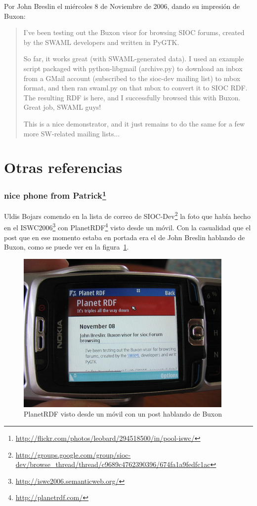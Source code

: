 Por John Breslin el miércoles 8 de Noviembre de 2006, dando su impresión de Buxon:

\begin{quote}
 I've been testing out the Buxon visor for browsing SIOC forums, created by the SWAML 
 developers and written in PyGTK.

 So far, it works great (with SWAML-generated data). I used an example script packaged 
 with python-libgmail (archive.py) to download an inbox from a GMail account (subscribed 
 to the sioc-dev mailing list) to mbox format, and then ran swaml.py on that mbox to 
 convert it to SIOC RDF. The resulting RDF is here, and I successfully browsed this with 
 Buxon. Great job, SWAML guys!

 This is a nice demonstrator, and it just remains to do the same for a few more 
 SW-related mailing lists...
\end{quote}

\section{Otras referencias}

\subsubsection*{nice phone from Patrick\footnote{\url{http://flickr.com/photos/leobard/294518500/in/pool-iswc/}}}

Uldis Bojars comendo en la lista de correo de SIOC-Dev\footnote{\url{http://groups.google.com/group/sioc-dev/browse_thread/thread/c9689c4762390396/674fa1a9fedfc1ac}}
la foto que había hecho en el ISWC2006\footnote{\url{http://iswc2006.semanticweb.org/}}
con PlanetRDF\footnote{\url{http://planetrdf.com/}} visto desde un móvil. Con la casualidad
que el post que en ese momento estaba en portada era el de John Breslin hablando de Buxon,
como se puede ver en la figura~\ref{fig:planetrdf-mobile}.

\begin{figure}[ht]
	\centering
	\includegraphics{images/screenshots/planetrdf-mobile.png}
	\caption{PlanetRDF visto desde un móvil con un post hablando de Buxon}
	\label{fig:planetrdf-mobile}
\end{figure}


